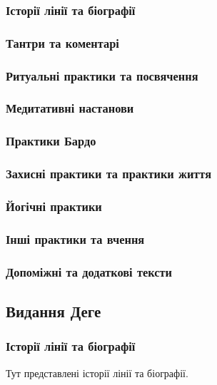 \documentclass{article}
\begin{document}
\subsubsection{Історії лінії та біографії}
\subsubsection{Тантри та коментарі}
\subsubsection{Ритуальні практики та посвячення}
\subsubsection{Медитативні настанови}
\subsubsection{Практики Бардо}
\subsubsection{Захисні практики та практики життя}
\subsubsection{Йогічні практики}
\subsubsection{Інші практики та вчення}
\subsubsection{Допоміжні та додаткові тексти}

\newpage
\subsection{Видання Деге}

\subsubsection{Історії лінії та біографії}

Тут представлені історії лінії та біографії.
\end{document}
